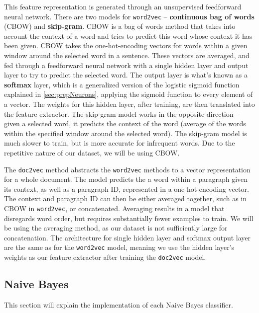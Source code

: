 \documentclass[12pt,a4paper,twoside,openright]{report}
\begin{document}
This feature representation is generated through an unsupervised feedforward neural network. There
are two models for \texttt{word2vec} -- \textbf{continuous bag of words} (CBOW) and \textbf{skip-gram}.
CBOW is a bag of words method that takes into
account the context of a word and tries to predict this word whose context it has been given.
CBOW takes the one-hot-encoding vectors
for words within a given window around the selected word in a sentence. These vectors are averaged,
and fed through a feedforward neural network with a single hidden layer 
and output layer to try to predict the selected word. The output layer is what's known as a \textbf{softmax}
layer, which is a generalized version of the logistic sigmoid function explained in \cref{sec:prepNeurons},
applying the sigmoid function to every element of a vector.
The weights for this hidden layer, after training, are then translated into the feature extractor.
The skip-gram model works in the opposite
direction -- given a selected word, it predicts the
context of the word (average of the words within the specified window around the selected word).
The skip-gram model is much slower to train, but is more accurate for infrequent words.
Due to the repetitive nature of our dataset, we will be using CBOW.


The \texttt{doc2vec} method abstracts the \texttt{word2vec} methods to a vector representation
for a whole document. The model predicts the a word within a paragraph given its context, as well
as a paragraph ID, represented in a one-hot-encoding vector. The context and paragraph ID can then
be either averaged together, such as in CBOW in \texttt{word2vec}, or concatenated. Averaging
results in a model that disregards word order, but requires substantially fewer
examples to train. We will be using the averaging method, as our dataset is not sufficiently
large for concatenation. The architecture for single hidden layer and softmax output layer are
the same as for the \texttt{word2vec} model, meaning we use the hidden layer's weights as our
feature extractor after training the \texttt{doc2vec} model.


\subsection{Naive Bayes}
\label{sec:impNB}
This section will explain the implementation of each Naive Bayes classifier.
\end{document}
